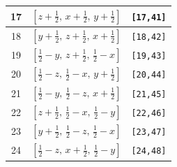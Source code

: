 \documentclass[fleqn,8pt]{jsarticle}
\begin{document}
\begin{longtable}{ccc}
17 & $\left[ z + \frac{1}{2},\, x + \frac{1}{2},\, y + \frac{1}{2} \right]$ & {\tt [17,41]} \\ \hline
18 & $\left[ y + \frac{1}{2},\, z + \frac{1}{2},\, x + \frac{1}{2} \right]$ & {\tt [18,42]} \\ \hline
19 & $\left[ \frac{1}{2} - y,\, z + \frac{1}{2},\, \frac{1}{2} - x \right]$ & {\tt [19,43]} \\ \hline
20 & $\left[ \frac{1}{2} - z,\, \frac{1}{2} - x,\, y + \frac{1}{2} \right]$ & {\tt [20,44]} \\ \hline
21 & $\left[ \frac{1}{2} - y,\, \frac{1}{2} - z,\, x + \frac{1}{2} \right]$ & {\tt [21,45]} \\ \hline
22 & $\left[ z + \frac{1}{2},\, \frac{1}{2} - x,\, \frac{1}{2} - y \right]$ & {\tt [22,46]} \\ \hline
23 & $\left[ y + \frac{1}{2},\, \frac{1}{2} - z,\, \frac{1}{2} - x \right]$ & {\tt [23,47]} \\ \hline
24 & $\left[ \frac{1}{2} - z,\, x + \frac{1}{2},\, \frac{1}{2} - y \right]$ & {\tt [24,48]} \\
\end{longtable}
\end{document}
